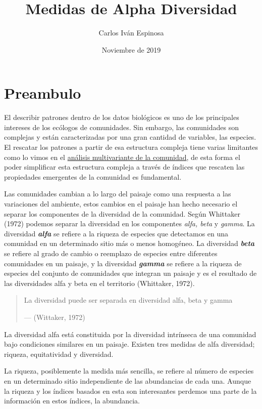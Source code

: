 \documentclass[]{book}
\title{Medidas de Alpha Diversidad}
\author{Carlos Iván Espinosa}
\date{Noviembre de 2019}
\begin{document}
\maketitle

{
\setcounter{tocdepth}{1}
\tableofcontents
}
\chapter*{Preambulo}\label{preambulo}

El describir patrones dentro de los datos biológicos es uno de los
principales intereses de los ecólogos de comunidades. Sin embargo, las
comunidades son complejas y están caracterizadas por una gran cantidad
de variables, las especies. El rescatar los patrones a partir de esa
estructura compleja tiene varias limitantes como lo vimos en el
\href{https://ciespinosa.github.io/AnalisisMultivariante/index.html}{análisis
multivariante de la comunidad}, de esta forma el poder simplificar esta
estructura compleja a través de índices que rescaten las propiedades
emergentes de la comunidad es fundamental.

Las comunidades cambian a lo largo del paisaje como una respuesta a las
variaciones del ambiente, estos cambios en el paisaje han hecho
necesario el separar los componentes de la diversidad de la comunidad.
Según Whittaker (1972) podemos separar la diversidad en los componentes
\emph{alfa, beta} y \emph{gamma}. La diversidad \emph{\textbf{alfa}} se
refiere a la riqueza de especies que detectamos en una comunidad en un
determinado sitio más o menos homogéneo. La diversidad
\emph{\textbf{beta}} se refiere al grado de cambio o reemplazo de
especies entre diferentes comunidades en un paisaje, y la diversidad
\emph{\textbf{gamma}} se refiere a la riqueza de especies del conjunto
de comunidades que integran un paisaje y es el resultado de las
diversidades alfa y beta en el territorio (Whittaker, 1972).

\begin{quote}
La diversidad puede ser separada en diversidad alfa, beta y gamma

--- (Wittaker, 1972)
\end{quote}

La diversidad alfa está constituida por la diversidad intrínseca de una
comunidad bajo condiciones similares en un paisaje. Existen tres medidas
de alfa diversidad; riqueza, equitatividad y diversidad.

La riqueza, posiblemente la medida más sencilla, se refiere al número de
especies en un determinado sitio independiente de las abundancias de
cada una. Aunque la riqueza y los índices basados en esta son
interesantes perdemos una parte de la información en estos índices, la
abundancia.
\end{document}
